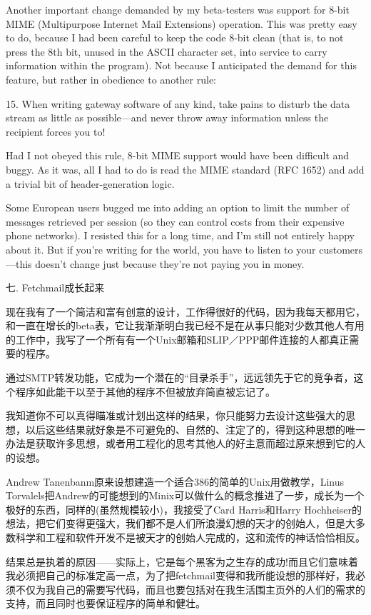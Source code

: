 \documentclass[a4paper,12pt,UTF8,twoside]{ctexbook}
\begin{document}
Another important change demanded by my beta-testers was support for 8-bit MIME (Multipurpose Internet Mail Extensions) operation. This was pretty easy to do, because I had been careful to keep the code 8-bit clean (that is, to not press the 8th bit, unused in the ASCII character set, into service to carry information within the program). Not because I anticipated the demand for this feature, but rather in obedience to another rule:

15. When writing gateway software of any kind, take pains to disturb the data stream as little as possible—and never throw away information unless the recipient forces you to!

Had I not obeyed this rule, 8-bit MIME support would have been difficult and buggy. As it was, all I had to do is read the MIME standard (RFC 1652) and add a trivial bit of header-generation logic.

Some European users bugged me into adding an option to limit the number of messages retrieved per session (so they can control costs from their expensive phone networks). I resisted this for a long time, and I'm still not entirely happy about it. But if you're writing for the world, you have to listen to your customers—this doesn't change just because they're not paying you in money.

七. Fetchmail成长起来


现在我有了一个简洁和富有创意的设计，工作得很好的代码，因为我每天都用它，和一直在增长的beta表，它让我渐渐明白我已经不是在从事只能对少数其他人有用的工作中，我写了一个所有有一个Unix邮箱和SLIP／PPP邮件连接的人都真正需要的程序。


通过SMTP转发功能，它成为一个潜在的“目录杀手”，远远领先于它的竞争者，这个程序如此能干以至于其他的程序不但被放弃简直被忘记了。


我知道你不可以真得瞄准或计划出这样的结果，你只能努力去设计这些强大的思想，以后这些结果就好象是不可避免的、自然的、注定了的，得到这种思想的唯一办法是获取许多思想，或者用工程化的思考其他人的好主意而超过原来想到它的人的设想。


Andrew Tanenbanm原来设想建造一个适合386的简单的Unix用做教学，Linus Torvalels把Andrew的可能想到的Minix可以做什么的概念推进了一步，成长为一个极好的东西，同样的(虽然规模较小)，我接受了Card Harris和Harry Hochheiser的想法，把它们变得更强大，我们都不是人们所浪漫幻想的天才的创始人，但是大多数科学和工程和软件开发不是被天才的创始人完成的，这和流传的神话恰恰相反。


结果总是执着的原因——实际上，它是每个黑客为之生存的成功!而且它们意味着我必须把自己的标准定高一点，为了把fetchmail变得和我所能设想的那样好，我必须不仅为我自己的需要写代码，而且也要包括对在我生活围主页外的人们的需求的支持，而且同时也要保证程序的简单和健壮。
\end{document}
